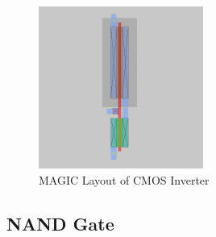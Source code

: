 \documentclass[conference]{IEEEtran}
\begin{document}
\begin{figure}[H]
    \centering
    \includegraphics[width=0.48\textwidth]{images/inv_cmos_layout.png}
    \caption{MAGIC Layout of CMOS Inverter}
\end{figure}

\subsection{NAND Gate}
\end{document}
